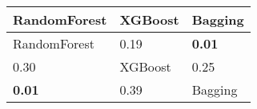 \begin{tabular}{lll}
\toprule
RandomForest & XGBoost & Bagging \\
\midrule
RandomForest & 0.19 & \textbf{0.01} \\
0.30 & XGBoost & 0.25 \\
\textbf{0.01} & 0.39 & Bagging \\
\bottomrule
\end{tabular}
